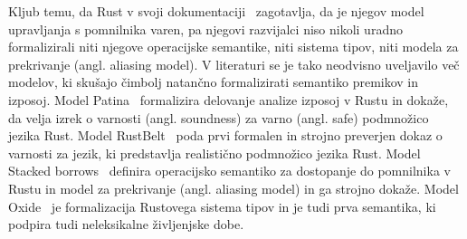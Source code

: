 Kljub temu, da Rust v svoji dokumentaciji~\cite{klabnik2023rust} zagotavlja, da je njegov model upravljanja s pomnilnika varen, pa njegovi razvijalci niso nikoli uradno formalizirali niti njegove operacijske semantike, niti sistema tipov, niti modela za prekrivanje (angl. aliasing model). V literaturi se je tako neodvisno uveljavilo več modelov, ki skušajo čimbolj natančno formalizirati semantiko premikov in izposoj. Model Patina~\cite{reed2015patina} formalizira delovanje analize izposoj v Rustu in dokaže, da velja izrek o varnosti (angl. soundness) za varno (angl. safe) podmnožico jezika Rust. Model RustBelt~\cite{10.1145/3158154} poda prvi formalen in strojno preverjen dokaz o varnosti za jezik, ki predstavlja realistično podmnožico jezika Rust. Model Stacked borrows~\cite{StackedBorrows} definira operacijsko semantiko za dostopanje do pomnilnika v Rustu in model za prekrivanje (angl. aliasing model) in ga strojno dokaže. Model Oxide~\cite{weiss2021oxide} je formalizacija Rustovega sistema tipov in je tudi prva semantika, ki podpira tudi neleksikalne življenjske dobe. 